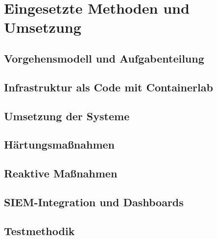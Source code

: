 \chapter{Eingesetzte Methoden und Umsetzung}\label{chap:eingesetzte-methoden-und-umsetzung}


\section{Vorgehensmodell und Aufgabenteilung}\label{sec:vorgehensmodell-und-aufgabenteilung}


\section{Infrastruktur als Code mit Containerlab}\label{sec:infrastruktur-als-code-mit-containerlab}


\section{Umsetzung der Systeme}\label{sec:umsetzung-der-systeme}


\section{Härtungsmaßnahmen}\label{sec:haertungsmassnahmen}


\section{Reaktive Maßnahmen}\label{sec:reaktive-massnahmen}


\section{SIEM-Integration und Dashboards}\label{sec:siem-integration-und-dashboards}


\section{Testmethodik}\label{sec:testmethodik}

